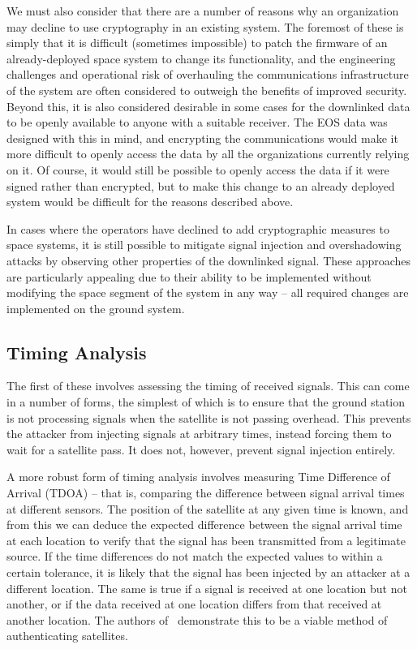 We must also consider that there are a number of reasons why an organization may decline to use cryptography in an existing system.
The foremost of these is simply that it is difficult (sometimes impossible) to patch the firmware of an already-deployed space system to change its functionality, and the engineering challenges and operational risk of overhauling the communications infrastructure of the system are often considered to outweigh the benefits of improved security.
Beyond this, it is also considered desirable in some cases for the downlinked data to be openly available to anyone with a suitable receiver.
The EOS data was designed with this in mind, and encrypting the communications would make it more difficult to openly access the data by all the organizations currently relying on it.
Of course, it would still be possible to openly access the data if it were signed rather than encrypted, but to make this change to an already deployed system would be difficult for the reasons described above.

In cases where the operators have declined to add cryptographic measures to space systems, it is still possible to mitigate signal injection and overshadowing attacks by observing other properties of the downlinked signal.
These approaches are particularly appealing due to their ability to be implemented without modifying the space segment of the system in any way -- all required changes are implemented on the ground system.


\subsection{Timing Analysis}

The first of these involves assessing the timing of received signals.
This can come in a number of forms, the simplest of which is to ensure that the ground station is not processing signals when the satellite is not passing overhead.
This prevents the attacker from injecting signals at arbitrary times, instead forcing them to wait for a satellite pass.
It does not, however, prevent signal injection entirely.

A more robust form of timing analysis involves measuring Time Difference of Arrival (TDOA) -- that is, comparing the difference between signal arrival times at different sensors.
The position of the satellite at any given time is known, and from this we can deduce the expected difference between the signal arrival time at each location to verify that the signal has been transmitted from a legitimate source.
If the time differences do not match the expected values to within a certain tolerance, it is likely that the signal has been injected by an attacker at a different location.
The same is true if a signal is received at one location but not another, or if the data received at one location differs from that received at another location.
The authors of~\cite{jedermann2021orbit} demonstrate this to be a viable method of authenticating satellites.

